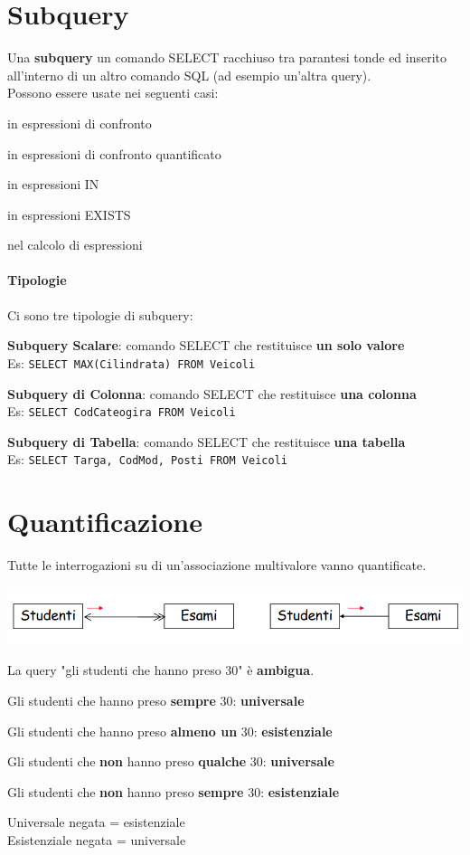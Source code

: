 \documentclass[10pt]{book}
\begin{document}
\section{Subquery}
Una \textbf{subquery} un comando SELECT racchiuso tra parantesi tonde ed inserito all'interno di un altro comando SQL (ad esempio un'altra query).\\
Possono essere usate nei seguenti casi:
\begin{list}{}{}
	\item in espressioni di confronto
	\item in espressioni di confronto quantificato
	\item in espressioni IN
	\item in espressioni EXISTS
	\item nel calcolo di espressioni
\end{list}
\paragraph{Tipologie} Ci sono tre tipologie di subquery:
\begin{list}{}{}
	\item \textbf{Subquery Scalare}: comando SELECT che restituisce \textbf{un solo valore}\\
	Es: \texttt{SELECT MAX(Cilindrata) FROM Veicoli}
	\item \textbf{Subquery di Colonna}: comando SELECT che restituisce \textbf{una colonna}\\
	Es: \texttt{SELECT CodCateogira FROM Veicoli}
	\item \textbf{Subquery di Tabella}: comando SELECT che restituisce \textbf{una tabella}\\
	Es: \texttt{SELECT Targa, CodMod, Posti FROM Veicoli}
\end{list}
\pagebreak
\section{Quantificazione}
Tutte le interrogazioni su di un'associazione multivalore vanno quantificate.
\begin{center}
	\includegraphics[scale=0.6]{quantific.png}
\end{center}
La query "gli studenti che hanno preso 30" è \textbf{ambigua}.
\begin{list}{}{}
	\item Gli studenti che hanno preso \textbf{sempre} 30: \textbf{universale}
	\item Gli studenti che hanno preso \textbf{almeno un} 30: \textbf{esistenziale}
	\item Gli studenti che \textbf{non} hanno preso \textbf{qualche} 30: \textbf{universale}
	\item Gli studenti che \textbf{non} hanno preso \textbf{sempre} 30: \textbf{esistenziale}
\end{list}
Universale negata = esistenziale\\
Esistenziale negata = universale
\end{document}
